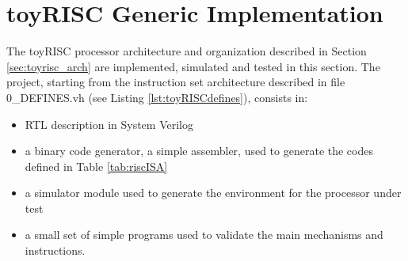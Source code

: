\newpage

\section{toyRISC Generic Implementation}\label{toyRiscImpl}

The toyRISC processor architecture and organization described in Section \ref{sec:toyrisc_arch} are implemented, simulated and tested in this section. The project, starting from the instruction set architecture described in file 0\_DEFINES.vh  (see Listing \ref{lst:toyRISCdefines}), consists in:
\begin{itemize}
    \item RTL description in System Verilog
    \item a binary code generator, a simple assembler, used to generate the codes defined in Table \ref{tab:riscISA}
    \item a simulator module used to generate the environment for the processor under test
    \item a small set of simple programs used to validate the main mechanisms and instructions.
\end{itemize}


